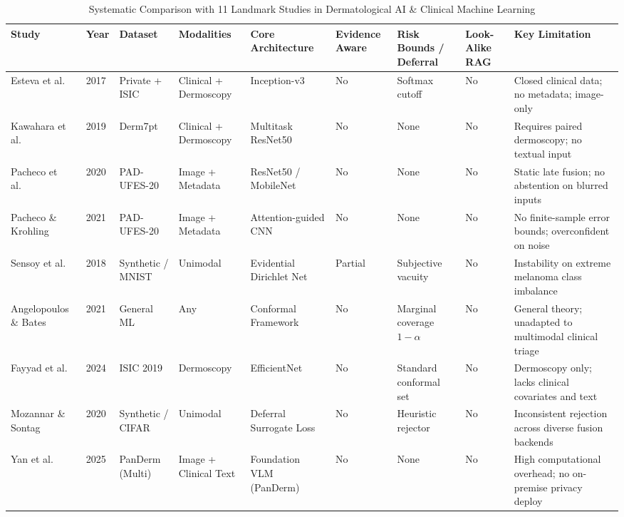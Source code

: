 \documentclass[conference]{IEEEtran}
\begin{document}
\begin{table}[t]
\caption{Systematic Comparison with 11 Landmark Studies in Dermatological AI \& Clinical Machine Learning}
\label{tab:related_work}
\centering
\scriptsize
\setlength{\tabcolsep}{3pt}
\begin{tabular}{@{}lllllllll@{}}
\toprule
\textbf{Study} & \textbf{Year} & \textbf{Dataset} & \textbf{Modalities} & \textbf{Core Architecture} & \textbf{Evidence Aware} & \textbf{Risk Bounds / Deferral} & \textbf{Look-Alike RAG} & \textbf{Key Limitation} \\
\midrule
Esteva et al.\ \cite{esteva2017dermatologist} & 2017 & Private + ISIC & Clinical + Dermoscopy & Inception-v3 & No & Softmax cutoff & No & Closed clinical data; no metadata; image-only \\
Kawahara et al.\ \cite{kawahara2019seven} & 2019 & Derm7pt & Clinical + Dermoscopy & Multitask ResNet50 & No & None & No & Requires paired dermoscopy; no textual input \\
Pacheco et al.\ \cite{pacheco2020pad} & 2020 & PAD-UFES-20 & Image + Metadata & ResNet50 / MobileNet & No & None & No & Static late fusion; no abstention on blurred inputs \\
Pacheco \& Krohling \cite{pacheco2021attention} & 2021 & PAD-UFES-20 & Image + Metadata & Attention-guided CNN & No & None & No & No finite-sample error bounds; overconfident on noise \\
Sensoy et al.\ \cite{sensoy2018evidential} & 2018 & Synthetic / MNIST & Unimodal & Evidential Dirichlet Net & Partial & Subjective vacuity & No & Instability on extreme melanoma class imbalance \\
Angelopoulos \& Bates \cite{angelopoulos2021gentle} & 2021 & General ML & Any & Conformal Framework & No & Marginal coverage $1-\alpha$ & No & General theory; unadapted to multimodal clinical triage \\
Fayyad et al.\ \cite{fayyad2024empirical} & 2024 & ISIC 2019 & Dermoscopy & EfficientNet & No & Standard conformal set & No & Dermoscopy only; lacks clinical covariates and text \\
Mozannar \& Sontag \cite{mozannar2020consistent} & 2020 & Synthetic / CIFAR & Unimodal & Deferral Surrogate Loss & No & Heuristic rejector & No & Inconsistent rejection across diverse fusion backends \\
Yan et al.\ \cite{yan2025multimodal} & 2025 & PanDerm (Multi) & Image + Clinical Text & Foundation VLM (PanDerm) & No & None & No & High computational overhead; no on-premise privacy deploy \\

\end{tabular}
\end{table}
\end{document}
